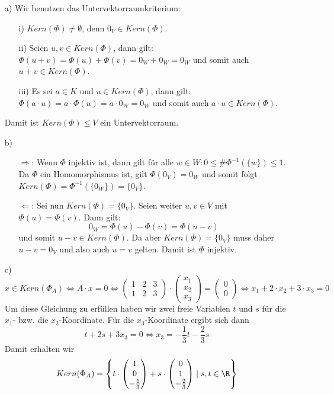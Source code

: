\begin{itemize}
\item[a)]
Wir benutzen das Untervektorraumkriterium:
\begin{itemize}
\item[i)] $Kern(\Phi) \ne \emptyset$, denn $0_V \in Kern(\Phi)$.
\item[ii)] Seien $u,v \in Kern(\Phi)$, dann gilt: $\Phi(u+v)=\Phi(u)+\Phi(v)=0_W+0_W=0_W$ und somit auch $u+v \in Kern(\Phi)$.
\item[iii)] Es sei $a \in K$ und $u\in Kern(\Phi)$, dann gilt: $\Phi(a\cdot u)=a\cdot \Phi(u)=a\cdot 0_W=0_W$ und somit auch $a\cdot u \in Kern(\Phi)$.
\end{itemize}
Damit ist $Kern(\Phi) \le V$ ein Untervektorraum.

\item[b)]
\begin{itemize}
\item[$\Rightarrow$:] Wenn $\Phi$ injektiv ist, dann gilt für alle $w\in W: 0\le \#\Phi^{-1}(\{w\}) \le 1$. Da $\Phi$ ein Homomorphismus ist, gilt $\Phi(0_V)=0_W$ und somit folgt $Kern(\Phi)=\Phi^{-1}(\{0_W\})=\{0_V\}$. 
\item[$\Leftarrow$:] Sei nun $Kern(\Phi)=\{0_V\}$. Seien weiter $u,v \in V$ mit $\Phi(u)=\Phi(v)$. Dann gilt:
$$0_W=\Phi(u)-\Phi(v)=\Phi(u-v)$$
und somit $u-v \in Kern(\Phi)$. Da aber $Kern(\Phi)=\{0_V\}$ muss daher $u-v=0_V$ und also auch $u=v$ gelten. Damit ist $\Phi$ injektiv.
\end{itemize}

\item[c)]
$$x \in Kern(\Phi_A) \Leftrightarrow A \cdot x =0 
\Leftrightarrow \begin{pmatrix} 1&2&3 \\ 1&2&3 \end{pmatrix} \cdot \begin{pmatrix} x_1\\x_2\\x_3 \end{pmatrix} = \begin{pmatrix} 0\\0 \end{pmatrix}
\Leftrightarrow   x_1+2\cdot x_2 + 3\cdot x_3=0$$
Um diese Gleichung zu erfüllen haben wir zwei freie Variablen $t$ und $s$ für die $x_1$- bzw. die $x_2$-Koordinate. Für die $x_3$-Koordinate ergibt sich dann
$$
t+2s+3x_3=0 \Leftrightarrow x_3= -\frac{1}{3}t-\frac{2}{3}s
$$
Damit erhalten wir
$$
Kern(\Phi_A)=\left\{t\cdot \begin{pmatrix}1\\0\\-\frac{1}{3}\end{pmatrix}+ s\cdot \begin{pmatrix}0\\1\\-\frac{2}{3}\end{pmatrix}\mid s,t \in \R \right\}
$$

\end{itemize}


